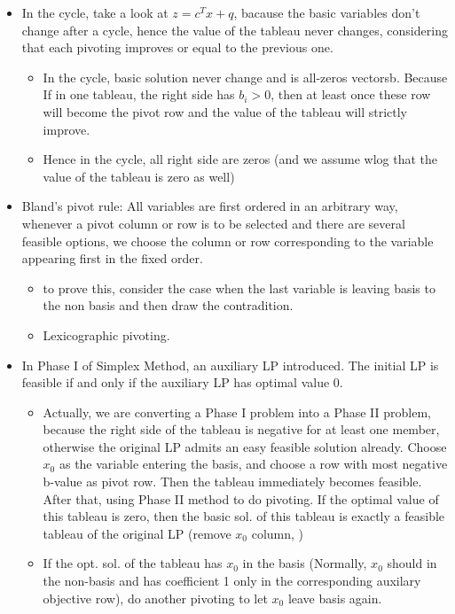\documentclass{article}
\begin{document}
\begin{itemize}
\begin{itemize}
\end{itemize}
\item In the cycle, take a look at $z = c^Tx+q$, bacause the basic variables don't change after a cycle, hence the value of the tableau never changes, considering that each pivoting improves or equal to the previous one.
\begin{itemize}
\item In the cycle, basic solution never change and is all-zeros vectorsb. Because If in one tableau, the right side has $b_i>0$, then at least once these row will become the pivot row and the value of the tableau will strictly improve.
\item Hence in the cycle, all right side are zeros (and we assume wlog that the value of the tableau is zero as well)
\end{itemize}
\item Bland's pivot rule: All variables are first ordered in an arbitrary way, whenever a pivot column or row is to be selected and there are several feasible options, we choose the column or row corresponding to the variable appearing first in the fixed order.
\begin{itemize}
\item to prove this, consider the case when the last variable is leaving basis to the non basis and then draw the contradition.
\item Lexicographic pivoting.
\end{itemize}
\item In Phase I of Simplex Method, an auxiliary LP introduced. The initial LP is feasible if and only if the auxiliary LP has optimal value 0.
\begin{itemize}
\item Actually, we are converting a Phase I problem into a Phase II problem, because the right side of the tableau is negative for at least one member, otherwise the original LP admits an easy feasible solution already. Choose $x_0$ as the variable entering the basis, and choose a row with most negative b-value as pivot row. Then the tableau immediately becomes feasible. After that, using Phase II method to do pivoting. If the optimal value of this tableau is zero, then the basic sol. of this tableau is exactly a feasible tableau of the original LP (remove $x_0$ column, )
\item If the opt. sol. of the tableau has $x_0$ in the basis (Normally, $x_0$ should in the non-basis and has coefficient 1 only in the corresponding auxilary objective row), do another pivoting to let $x_0$ leave basis again.

\end{itemize}
\end{itemize}
\end{document}
